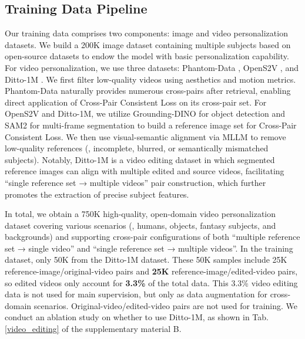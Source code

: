 \subsection{Training Data Pipeline}
\label{data_pipeline}
Our training data comprises two components: image and video personalization datasets. We build a 200K image dataset containing multiple subjects based on open-source datasets \cite{UNO,echo-4o} to endow the model with basic personalization capability. For video personalization, we use three datasets: Phantom-Data \cite{phantom-data}, OpenS2V \cite{yuan2025opens2v}, and Ditto-1M \cite{zhang2025region}. We first filter low-quality videos using aesthetics and motion metrics. Phantom-Data naturally provides numerous cross-pairs after retrieval, enabling direct application of Cross-Pair Consistent Loss on its cross-pair set. For OpenS2V and Ditto-1M, we utilize Grounding-DINO \cite{groundingdino} for object detection and SAM2 \cite{sam2} for multi-frame segmentation to build a reference image set for Cross-Pair Consistent Loss. We then use visual-semantic alignment via MLLM \cite{qwen25} to remove low-quality references (\eg, incomplete, blurred, or semantically mismatched subjects). Notably, Ditto-1M is a video editing dataset in which segmented reference images can align with multiple edited and source videos, facilitating ``single reference set → multiple videos'' pair construction, which further promotes the extraction of precise subject features. 

In total, we obtain a 750K high-quality, open-domain video personalization dataset covering various scenarios (\eg, humans, objects, fantasy subjects, and backgrounds) and supporting cross-pair configurations of both ``multiple reference set → single video'' and ``single reference set → multiple videos''.  In the training dataset, only 50K from the Ditto-1M dataset. These 50K samples include 25K reference-image/original-video pairs and \textbf{25K} reference-image/edited-video pairs, so edited videos only account for \textbf{3.3\%} of the total data. This 3.3\% video editing data is not used for main supervision, but only as data augmentation for cross-domain scenarios. Original-video/edited-video pairs are not used for training. We conduct an ablation study on whether to use Ditto-1M, as shown in Tab. \ref{video_editing} of the supplementary material B.

